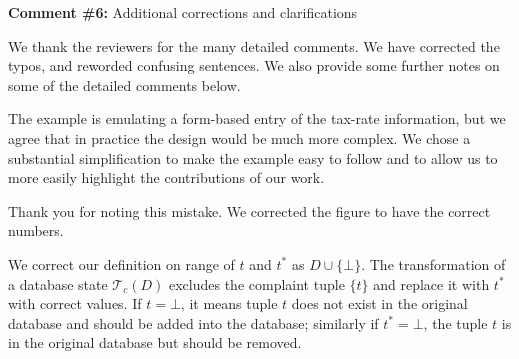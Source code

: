 \comskip

\noindent
\textbf{Comment \#6:} Additional corrections and clarifications

\smallskip

We thank the reviewers for the many detailed comments. We have corrected the
typos, and reworded confusing sentences. We also provide some further notes on
some of the detailed comments below.

\begin{quote}
\end{quote}

The example is emulating a form-based entry of the tax-rate information, but
we agree that in practice the design would be much more complex. We chose a
substantial simplification to make the example easy to follow and to allow us
to more easily highlight the contributions of our work.

\begin{quote}
\end{quote}

Thank you for noting this mistake. We corrected the figure to have the
correct numbers.


\begin{quote}
\end{quote}

 


\begin{quote}
\end{quote}

We correct our definition on range of $t$ and $t^*$ as $D \cup \{\bot\}$. The transformation of 
a database state $\mathcal{T}_c(D)$ excludes the complaint tuple $\{t\}$ and replace it with 
$t^*$ with correct values. If $t = \bot$, it means tuple $t$ does not exist in the original
database and should be added into the database; similarly if $t^* = \bot$, the tuple $t$ is in
the original database but should be removed. 

